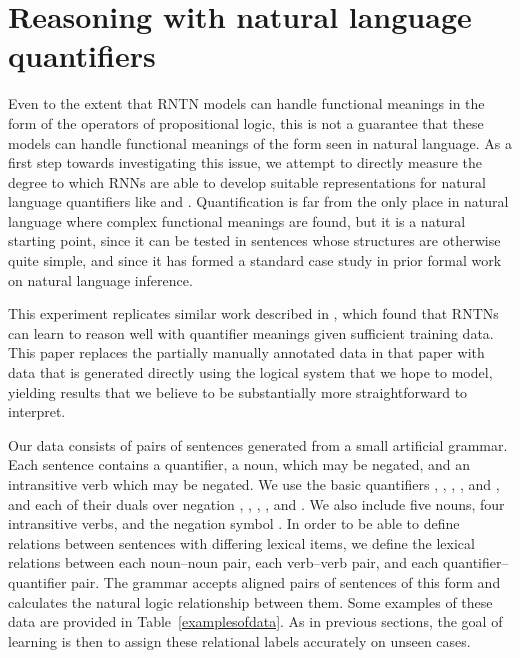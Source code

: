 \section{Reasoning with natural language quantifiers}\label{sec:quantifiers}

Even to the extent that RNTN models can handle functional meanings in
the form of the operators of propositional logic, this is not a
guarantee that these models can handle functional meanings of the form
seen in natural language. As a first step towards investigating this
issue, we attempt to directly measure the degree to which RNNs are
able to develop suitable representations for natural language
quantifiers like  and . Quantification is far from
the only place in natural language where complex functional meanings
are found, but it is a natural starting point, since it can be tested
in sentences whose structures are otherwise quite simple, and since it
has formed a standard case study in prior formal work on natural
language inference.


This experiment replicates similar work described in
\cite{bowman2013can}, which found that RNTNs can learn to reason well
with quantifier meanings given sufficient training data. This paper
replaces the partially manually annotated data in that paper with data
that is generated directly using the logical system that we hope to
model, yielding results that we believe to be substantially more
straightforward to interpret.

Our data consists of pairs of sentences generated from a small
artificial grammar. Each sentence contains a quantifier, a noun, which
may be negated, and an intransitive verb which may be negated. We use
the basic quantifiers , , , , and
, and each of their duals over negation ,
, , , and
. We also include five nouns, four intransitive
verbs, and the negation symbol . In order to be able to define
relations between sentences with differing lexical items, we define
the lexical relations between each noun--noun pair, each verb--verb
pair, and each quantifier--quantifier pair. The grammar accepts
aligned pairs of sentences of this form and calculates the natural
logic relationship between them.  Some examples of these data are
provided in Table~\ref{examplesofdata}.  As in previous sections, the
goal of learning is then to assign these relational labels accurately
on unseen cases.

